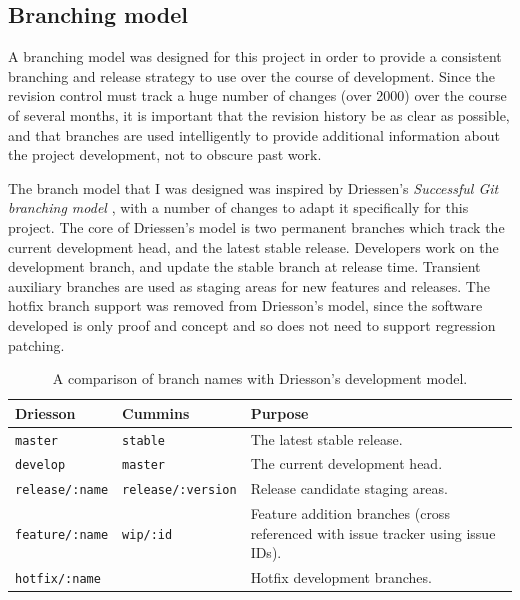 \subsection{Branching model}\label{subsec:branching-model}

A branching model was designed for this project in order to provide a
consistent branching and release strategy to use over the course of
development. Since the revision control must track a huge number of
changes (over 2000) over the course of several months, it is important
that the revision history be as clear as possible, and that branches
are used intelligently to provide additional information about the
project development, not to obscure past work.

The branch model that I was designed was inspired by Driessen's
\textit{Successful Git branching model} \cite{driessen2012successful},
with a number of changes to adapt it specifically for this
project. The core of Driessen's model is two permanent branches which
track the current development head, and the latest stable
release. Developers work on the development branch, and update the
stable branch at release time. Transient auxiliary branches are used
as staging areas for new features and releases. The hotfix branch
support was removed from Driesson's model, since the software
developed is only proof and concept and so does not need to support
regression patching.


\begin{table}[H]
\centering
\begin{tabular}{l l L{8cm}}
\textbf{Driesson} & \textbf{Cummins} & \textbf{Purpose}\\
\hline
\texttt{master} & \texttt{stable} & The latest stable release.\\
\texttt{develop} & \texttt{master} & The current development head.\\
\texttt{release/:name} & \texttt{release/:version} & Release candidate staging areas.\\
\texttt{feature/:name} & \texttt{wip/:id} & Feature addition branches (cross referenced with issue tracker using issue IDs).\\
\texttt{hotfix/:name} & & Hotfix development branches.\\
\end{tabular}
\caption[Development model branch names]
        {A comparison of branch names with Driesson's development model.}
\label{tab:branch-names}
\end{table}


